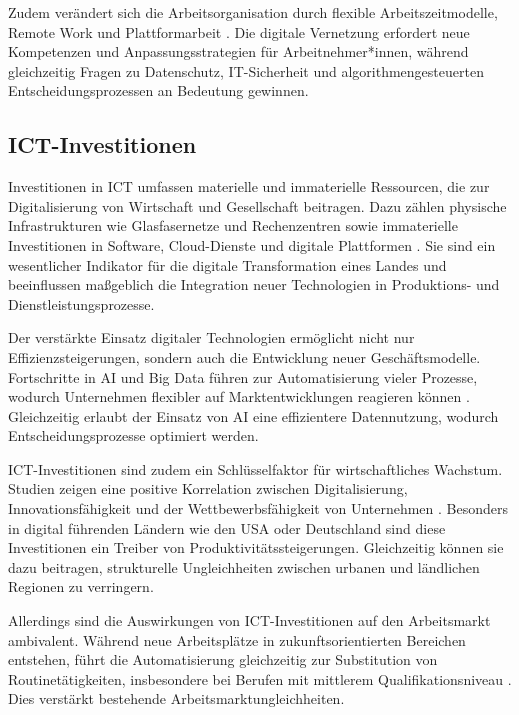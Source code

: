 Zudem verändert sich die Arbeitsorganisation durch flexible Arbeitszeitmodelle, Remote 
Work und Plattformarbeit \parencite[vgl.][S. 112]{schwab2016thefourth}. Die digitale 
Vernetzung erfordert neue Kompetenzen und Anpassungsstrategien für Arbeitnehmer*innen, 
während gleichzeitig Fragen zu Datenschutz, IT-Sicherheit und algorithmengesteuerten 
Entscheidungsprozessen an Bedeutung gewinnen.


\subsection{ICT-Investitionen}

Investitionen in \ac{ICT} umfassen materielle und immaterielle Ressourcen, die zur 
Digitalisierung von Wirtschaft und Gesellschaft beitragen. Dazu zählen physische 
Infrastrukturen wie Glasfasernetze und Rechenzentren sowie immaterielle Investitionen in 
Software, Cloud-Dienste und digitale Plattformen 
\parencite[vgl.][S. 15ff]{oecd2019measuring}. Sie sind ein wesentlicher Indikator für die 
digitale Transformation eines Landes und beeinflussen maßgeblich die Integration neuer 
Technologien in Produktions- und Dienstleistungsprozesse.

Der verstärkte Einsatz digitaler Technologien ermöglicht nicht nur Effizienzsteigerungen, 
sondern auch die Entwicklung neuer Geschäftsmodelle. Fortschritte in \ac{AI} und Big Data 
führen zur Automatisierung vieler Prozesse, wodurch Unternehmen flexibler auf 
Marktentwicklungen reagieren können \parencite[vgl.][S. 15ff]{oecd2019measuring}. 
Gleichzeitig erlaubt der Einsatz von \ac{AI} eine effizientere Datennutzung, wodurch 
Entscheidungsprozesse optimiert werden.

\ac{ICT}-Investitionen sind zudem ein Schlüsselfaktor für wirtschaftliches Wachstum. 
Studien zeigen eine positive Korrelation zwischen Digitalisierung, Innovationsfähigkeit 
und der Wettbewerbsfähigkeit von Unternehmen 
\parencite[vgl.][S. 22]{brynjolfsson2014thesecond}. Besonders in digital führenden Ländern 
wie den USA oder Deutschland sind diese Investitionen ein Treiber von 
Produktivitätssteigerungen. Gleichzeitig können sie dazu beitragen, strukturelle 
Ungleichheiten zwischen urbanen und ländlichen Regionen zu verringern.

Allerdings sind die Auswirkungen von \ac{ICT}-Investitionen auf den Arbeitsmarkt 
ambivalent. Während neue Arbeitsplätze in zukunftsorientierten Bereichen entstehen, führt 
die Automatisierung gleichzeitig zur Substitution von Routinetätigkeiten, insbesondere 
bei Berufen mit mittlerem Qualifikationsniveau \parencite[vgl.][S. 40]{frey2013thefuture}. 
Dies verstärkt bestehende Arbeitsmarktungleichheiten.

